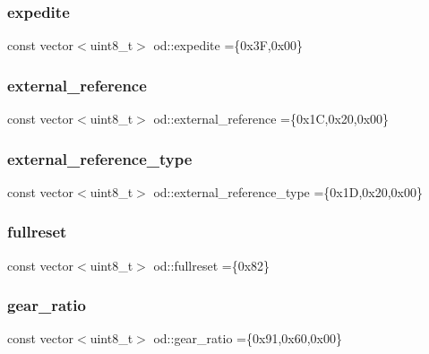 \subsubsection{\texorpdfstring{expedite}{expedite}}
{\footnotesize\ttfamily const vector$<$uint8\+\_\+t$>$ od\+::expedite =\{0x3\+F,0x00\}}

\mbox{\label{namespaceod_a647046f6eab50732e8d67e7898a0731a}} 
\subsubsection{\texorpdfstring{external\+\_\+reference}{external\_reference}}
{\footnotesize\ttfamily const vector$<$uint8\+\_\+t$>$ od\+::external\+\_\+reference =\{0x1\+C,0x20,0x00\}}

\mbox{\label{namespaceod_a1a637a5186ac9c6af08693d9ed6743f7}} 
\subsubsection{\texorpdfstring{external\+\_\+reference\+\_\+type}{external\_reference\_type}}
{\footnotesize\ttfamily const vector$<$uint8\+\_\+t$>$ od\+::external\+\_\+reference\+\_\+type =\{0x1\+D,0x20,0x00\}}

\mbox{\label{namespaceod_af9d6d0e820d6bc1ee375195e253f7b7b}} 
\subsubsection{\texorpdfstring{fullreset}{fullreset}}
{\footnotesize\ttfamily const vector$<$uint8\+\_\+t$>$ od\+::fullreset =\{0x82\}}

\mbox{\label{namespaceod_af615192e30bab04a02f1aa4c21a48642}} 
\subsubsection{\texorpdfstring{gear\+\_\+ratio}{gear\_ratio}}
{\footnotesize\ttfamily const vector$<$uint8\+\_\+t$>$ od\+::gear\+\_\+ratio =\{0x91,0x60,0x00\}}

